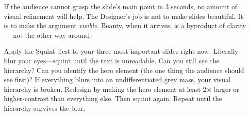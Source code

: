 \vspace{0.5em}


\begin{lessonbox}
If the audience cannot grasp the slide's main point in 3 seconds, no amount of visual refinement will help. The Designer's job is not to make slides beautiful. It is to make the argument \emph{visible}. Beauty, when it arrives, is a byproduct of clarity --- not the other way around.
\end{lessonbox}

\begin{keybox}
Apply the Squint Test to your three most important slides right now. Literally blur your eyes---squint until the text is unreadable. Can you still see the hierarchy? Can you identify the hero element (the one thing the audience should see first)? If everything blurs into an undifferentiated grey mass, your visual hierarchy is broken. Redesign by making the hero element at least 2$\times$ larger or higher-contrast than everything else. Then squint again. Repeat until the hierarchy survives the blur.
\end{keybox}
